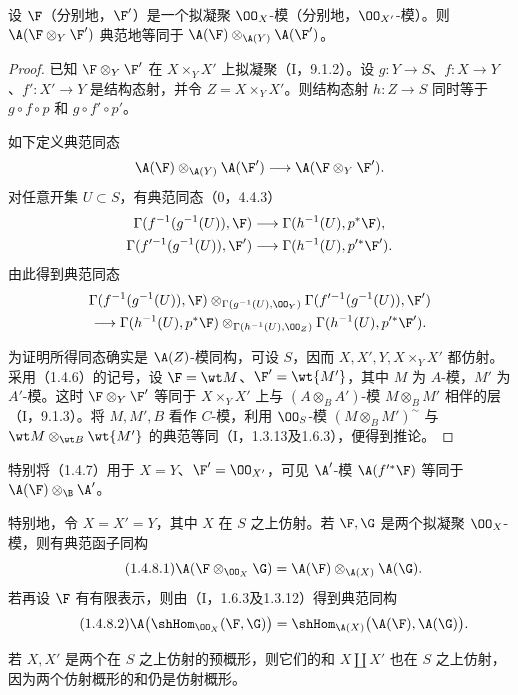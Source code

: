 设 $\F$（分别地，$\F'$）是一个拟凝聚 $\OO_X$-模（分别地，$\OO_{X'}$-模）。则
$\A(\F\otimes_Y\F')$ 典范地等同于 $\A(\F)\otimes_{\A(Y)}\A(\F')$。
\begin{proof}
已知 $\F\otimes_Y\F'$ 在 $X\times_YX'$ 上拟凝聚（I，9.1.2）。设
$g:Y\to S$、$f:X\to Y$、$f':X'\to Y$ 是结构态射，并令 $Z=X\times_YX'$。则结构态射 $h:Z\to S$ 同时等于 $g\circ f\circ p$ 和 $g\circ f'\circ p'$。

如下定义典范同态
\[
\A(\F)\otimes_{\A(Y)}\A(\F')\longrightarrow\A(\F\otimes_Y\F').
\]
对任意开集 $U\subset S$，有典范同态（0，4.4.3）
\begin{align*}
\Gamma(f^{-1}(g^{-1}(U)),\F)&\longrightarrow\Gamma(h^{-1}(U),p^*\F),\\
\Gamma(f'^{-1}(g^{-1}(U)),\F')&\longrightarrow\Gamma(h^{-1}(U),p'^*\F').
\end{align*}
由此得到典范同态
\begin{multline*}
\Gamma(f^{-1}(g^{-1}(U)),\F)
\otimes_{\Gamma(g^{-1}(U),\OO_Y)}
\Gamma(f'^{-1}(g^{-1}(U)),\F')\\
\longrightarrow
\Gamma(h^{-1}(U),p^*\F)\otimes_{\Gamma(h^{-1}(U),\OO_Z)}
\Gamma(h^{-1}(U),p'^*\F').
\end{multline*}

为证明所得同态确实是 $\A(Z)$-模同构，可设 $S$，因而 $X,X',Y,X\times_YX'$ 都仿射。采用（1.4.6）的记号，设 $\F=\wt M$、$\F'=\wt{M'}$，其中 $M$ 为 $A$-模，$M'$ 为 $A'$-模。这时 $\F\otimes_Y\F'$ 等同于 $X\times_YX'$ 上与 $(A\otimes_BA')$-模 $M\otimes_BM'$ 相伴的层（I，9.1.3）。将 $M,M',B$ 看作 $C$-模，利用 $\OO_S$-模
$(M\otimes_BM')^\sim$ 与 $\wt M\otimes_{\wt B}\wt{M'}$ 的典范等同（I，1.3.13及1.6.3），便得到推论。
\end{proof}
特别将（1.4.7）用于 $X=Y$、$\F'=\OO_{X'}$，可见 $\A'$-模 $\A(f'^*\F)$ 等同于 $\A(\F)\otimes_\B\A'$。

特别地，令 $X=X'=Y$，其中 $X$ 在 $S$ 之上仿射。若 $\F,\G$ 是两个拟凝聚 $\OO_X$-模，则有典范函子同构
\begin{equation}\tag{1.4.8.1}
\A(\F\otimes_{\OO_X}\G)=\A(\F)\otimes_{\A(X)}\A(\G).
\end{equation}
若再设 $\F$ 有有限表示，则由（I，1.6.3及1.3.12）得到典范同构
\begin{equation}\tag{1.4.8.2}
\A\bigl(\shHom_{\OO_X}(\F,\G)\bigr)
=\shHom_{\A(X)}\bigl(\A(\F),\A(\G)\bigr).
\end{equation}

若 $X,X'$ 是两个在 $S$ 之上仿射的预概形，则它们的和 $X\amalg X'$ 也在 $S$ 之上仿射，因为两个仿射概形的和仍是仿射概形。

